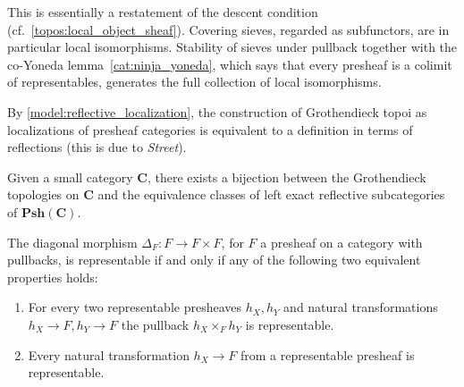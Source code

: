     \begin{remark}
        This is essentially a restatement of the descent condition (cf.~\ref{topos:local_object_sheaf}). Covering sieves, regarded as subfunctors, are in particular local isomorphisms. Stability of sieves under pullback together with the co-Yoneda lemma~\ref{cat:ninja_yoneda}, which says that every presheaf is a colimit of representables, generates the full collection of local isomorphisms.
    \end{remark}

    By \cref{model:reflective_localization}, the construction of Grothendieck topoi as localizations of presheaf categories is equivalent to a definition in terms of reflections (this is due to \textit{Street}).
    \begin{result}
        Given a small category $\mathbf{C}$, there exists a bijection between the Grothendieck topologies on $\mathbf{C}$ and the equivalence classes of left exact reflective subcategories of $\mathbf{Psh(C)}$.
    \end{result}


    \begin{property}[Diagonals]\label{topos:representable_diagonal}
        The diagonal morphism $\Delta_F:F\rightarrow F\times F$, for $F$ a presheaf on a category with pullbacks, is representable if and only if any of the following two equivalent properties holds:
        \begin{enumerate}
            \item For every two representable presheaves $h_X,h_Y$ and natural transformations $h_X\rightarrow F,h_Y\rightarrow F$ the pullback $h_X\times_Fh_Y$ is representable.
            \item Every natural transformation $h_X\rightarrow F$ from a representable presheaf is representable.
        \end{enumerate}
    \end{property}

